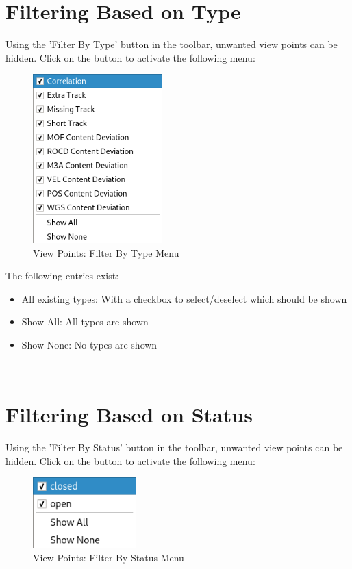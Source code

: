 \section{Filtering Based on Type}

Using the 'Filter By Type' button in the toolbar, unwanted view points can be hidden. Click on the button to activate the following menu:

\begin{figure}[H]
  \centering 
    \includegraphics[width=5cm,frame]{figures/view_points_filter_type.png}
  \caption{View Points: Filter By Type Menu}
\end{figure}

The following entries exist:

\begin{itemize}  
\item All existing types: With a checkbox to select/deselect which should be shown
\item Show All: All types are shown
\item Show None: No types are shown
\end{itemize}
\ \\

\section{Filtering Based on Status}

Using the 'Filter By Status' button in the toolbar, unwanted view points can be hidden. Click on the button to activate the following menu:

\begin{figure}[H]
  \centering 
    \includegraphics[width=4cm,frame]{figures/view_points_filter_status.png}
  \caption{View Points: Filter By Status Menu}
\end{figure}

